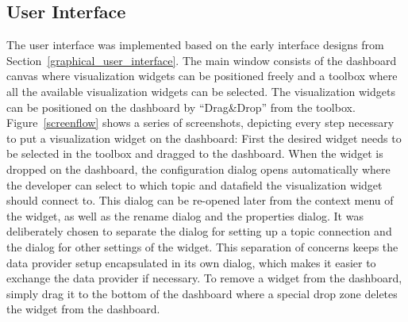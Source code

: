 \subsection{User Interface}
The user interface was implemented based on the early interface designs from Section~\ref{graphical_user_interface}. The main window consists of the dashboard canvas where visualization widgets can be positioned freely and a toolbox where all the available visualization widgets can be selected. The visualization widgets can be positioned on the dashboard by ``Drag\&Drop'' from the toolbox. Figure~\ref{screenflow} shows a series of screenshots, depicting every step necessary to put a visualization widget on the dashboard: First the desired widget needs to be selected in the toolbox and dragged to the dashboard. When the widget is dropped on the dashboard, the configuration dialog opens automatically where the developer can select to which topic and datafield the visualization widget should connect to. This dialog can be re-opened later from the context menu of the widget, as well as the rename dialog and the properties dialog. It was deliberately chosen to separate the dialog for setting up a topic connection and the dialog for other settings of the widget. This separation of concerns keeps the data provider setup encapsulated in its own dialog, which makes it easier to exchange the data provider if necessary. To remove a widget from the dashboard, simply drag it to the bottom of the dashboard where a special drop zone deletes the widget from the dashboard.

